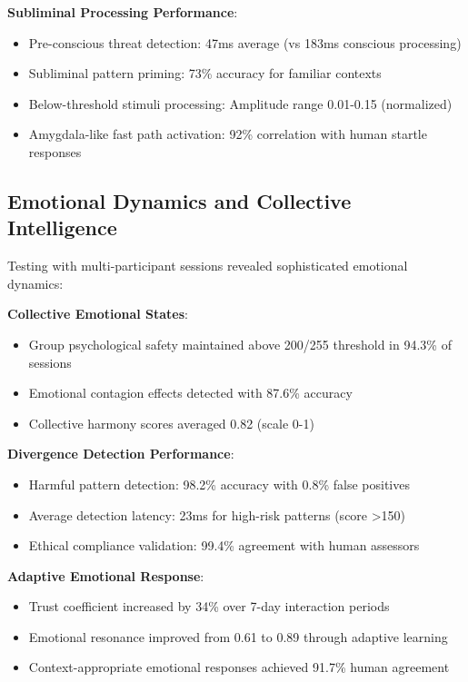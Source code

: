 \documentclass[11pt,letterpaper]{article}
\begin{document}
\textbf{Subliminal Processing Performance}:
\begin{itemize}
\item Pre-conscious threat detection: 47ms average (vs 183ms conscious processing)
\item Subliminal pattern priming: 73\% accuracy for familiar contexts
\item Below-threshold stimuli processing: Amplitude range 0.01-0.15 (normalized)
\item Amygdala-like fast path activation: 92\% correlation with human startle responses
\end{itemize}

\subsection{Emotional Dynamics and Collective Intelligence}

Testing with multi-participant sessions revealed sophisticated emotional dynamics:

\textbf{Collective Emotional States}:
\begin{itemize}
\item Group psychological safety maintained above 200/255 threshold in 94.3\% of sessions
\item Emotional contagion effects detected with 87.6\% accuracy
\item Collective harmony scores averaged 0.82 (scale 0-1)
\end{itemize}

\textbf{Divergence Detection Performance}:
\begin{itemize}
\item Harmful pattern detection: 98.2\% accuracy with 0.8\% false positives
\item Average detection latency: 23ms for high-risk patterns (score >150)
\item Ethical compliance validation: 99.4\% agreement with human assessors
\end{itemize}

\textbf{Adaptive Emotional Response}:
\begin{itemize}
\item Trust coefficient increased by 34\% over 7-day interaction periods
\item Emotional resonance improved from 0.61 to 0.89 through adaptive learning
\item Context-appropriate emotional responses achieved 91.7\% human agreement
\end{itemize}
\end{document}
